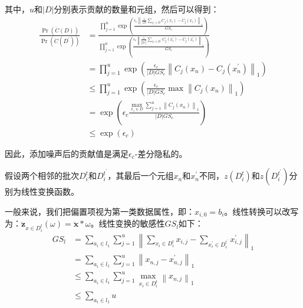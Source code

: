 其中，$u$和$|D|$分别表示贡献的数量和元组，然后可以得到：
\begin{equation}\label{贡献数量和元组}
\begin{aligned}
\frac{\operatorname{Pr}(\ddot{C}(D))}{\operatorname{Pr}\left(\ddot{C}\left(D^{\prime}\right)\right)} &=\frac{\prod_{j=1}^{u} \exp \left(\frac{\epsilon_{c}\left\|\frac{1}{|D|} \sum_{x_{i} \in D} C_{j}\left(x_{i}\right)-\ddot{C}_{j}\left(x_{i}\right)\right\|_{1}}{G S_{c}}\right)}{\prod_{j=1}^{u} \exp \left(\frac{\epsilon_{c}\left\|\frac{1}{\left|D^{\prime}\right|} \sum_{x_{i}^{\prime} \in D^{\prime}} C_{j}\left(x_{i}^{\prime}\right)-\ddot{C}_{j}\left(x_{i}^{\prime}\right)\right\|_{1}}{G S_{c}}\right)} \\
&=\prod_{j=1}^{u} \exp \left(\frac{\epsilon_{c}}{|D| G S_{c}}\left\|C_{j}\left(x_{n}\right)-C_{j}\left(x_{n}^{\prime}\right)\right\|_{1}\right) \\
& \leq \prod_{j=1}^{u} \exp \left(\frac{\epsilon_{c}}{|D| G S_{c}} \max \left\|C_{j}\left(x_{n}\right)\right\|_{1}\right) \\
&=\exp \left(\epsilon_{c} \frac{\max _{x_{i} \in D} \sum_{j=1}^{u}\left\|C_{j}\left(x_{n}\right)\right\|_{1}}{|D| G S_{c}}\right) \\
& \leq \exp \left(\epsilon_{c}\right)
\end{aligned}
\end{equation}

因此，添加噪声后的贡献值是满足$\epsilon_{c}$-差分隐私的。

假设两个相邻的批次$D_{i}^{t}$和$D_{i}^{t^{\prime}}$，其最后一个元组$x_{n}$和$x_{n}^{\prime}$不同，$z\left(D_{i}^{t}\right)$和$z\left(D_{i}^{t^{\prime}}\right)$分别为线性变换函数。

一般来说，我们把偏置项视为第一类数据属性，即：$x_{i,0}=b_{i}$。线性转换可以改写为：$\ddot{\mathbf{z}}_{x \in D_{i}^{t}}(\omega)=\ddot{\mathbf{x}} * \omega$。线性变换的敏感性$G S_{l}$如下：
\begin{equation}
\begin{aligned}
G S_{l} &=\sum_{a_{i} \in l_{1}} \sum_{j=1}^{u}\left\|\sum_{x_{i} \in D_{i}^{t}} x_{i, j}-\sum_{x_{i}^{\prime} \in D_{i}^{t^{\prime}}} x_{i, j}^{\prime}\right\|_{1} \\
&=\sum_{a_{i} \in l_{1}} \sum_{j=1}^{u}\left\|x_{n, j}-x_{n, j}^{\prime}\right\|_{1} \\
& \leq \sum_{a_{i} \in l_{1}} \sum_{j=1}^{u} \max _{x_{i} \in D_{i}^{t}}\left\|x_{n, j}\right\|_{1} \\
& \leq \sum_{a_{i} \in l_{1}} u
\end{aligned}
\end{equation}


